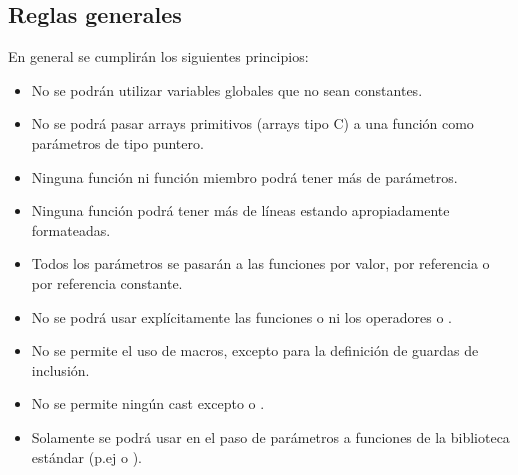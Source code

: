 \subsection{Reglas generales}

En general se cumplirán los siguientes principios:

\begin{itemize}

\item No se podrán utilizar variables globales que no sean constantes.

\item No se podrá pasar arrays primitivos (arrays tipo C)
a una función como parámetros de tipo puntero.

\item Ninguna función ni función miembro podrá tener más de  parámetros.

\item Ninguna función podrá tener más de  líneas estando apropiadamente
formateadas.

\item Todos los parámetros se pasarán a las funciones por valor, por referencia
o por referencia constante.

\item No se podrá usar explícitamente las funciones 
o  ni los operadores  o .

\item No se permite el uso de macros, excepto para la definición de guardas de inclusión.

\item No se permite ningún cast excepto  o .

\item Solamente se podrá usar  en el paso de parámetros a funciones
de la biblioteca estándar (p.ej  o ).

\end{itemize}
